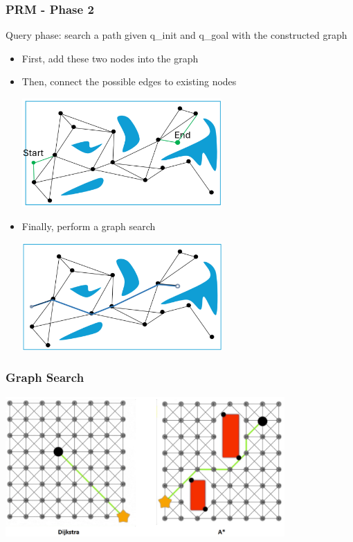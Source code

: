 \documentclass[10pt]{article}
\begin{document}
\subsubsection*{PRM - Phase 2}
Query phase: search a path given q\_init and q\_goal with the constructed graph
\begin{itemize}
	\item First, add these two nodes into the graph
	\item Then, connect the possible edges to existing nodes
    \begin{center} 
        \includegraphics*[width=0.6\textwidth]{L1_5.png} 
    \end{center}
    \item Finally, perform a graph search
    \begin{center} 
        \includegraphics*[width=0.6\textwidth]{L1_6.png} 
    \end{center}
\end{itemize}

\subsubsection*{Graph Search}
\begin{center} 
    \includegraphics*[width=0.8\textwidth]{L1_7.png} 
\end{center}
\end{document}
